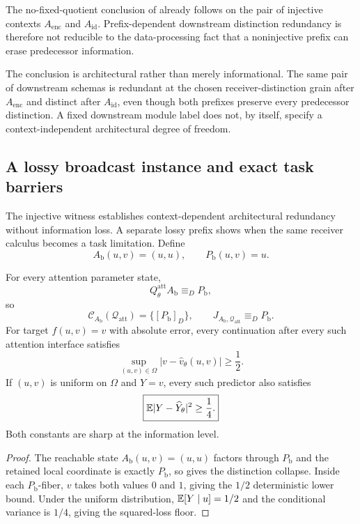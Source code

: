 \begin{corollary}\label{cor:injective-no-fixed-quotient-v14}
The no-fixed-quotient conclusion of  already follows on the pair of injective contexts $A_{\mathrm{enc}}$ and $A_{\mathrm{id}}$. Prefix-dependent downstream distinction redundancy is therefore not reducible to the data-processing fact that a noninjective prefix can erase predecessor information.
\end{corollary}

The conclusion is architectural rather than merely informational. The same pair of downstream schemas is redundant at the chosen receiver-distinction grain after $A_{\mathrm{enc}}$ and distinct after $A_{\mathrm{id}}$, even though both prefixes preserve every predecessor distinction. A fixed downstream module label does not, by itself, specify a context-independent architectural degree of freedom.

\subsection{A lossy broadcast instance and exact task barriers}

The injective witness establishes context-dependent architectural redundancy without information loss. A separate lossy prefix shows when the same receiver calculus becomes a task limitation. Define
\[
A_{\mathrm b}(u,v)=(u,u),
\qquad
P_{\mathrm b}(u,v)=u.
\]

\begin{proposition}\label{prop:broadcast-barrier-v14}
For every attention parameter state,
\[
Q^{\mathrm{att}}_\theta A_{\mathrm b}\equiv_DP_{\mathrm b},
\]
so
\[
\mathcal C_{A_{\mathrm b}}(\mathcal Q_{\mathrm{att}})=\{[P_{\mathrm b}]_D\},
\qquad
J_{A_{\mathrm b},\mathcal Q_{\mathrm{att}}}\equiv_DP_{\mathrm b}.
\]
For target $f(u,v)=v$ with absolute error, every continuation after every such attention interface satisfies
\[
\boxed{
\sup_{(u,v)\in\Omega}|v-\widehat v_\theta(u,v)|\ge\frac12.
}
\]
If $(u,v)$ is uniform on $\Omega$ and $Y=v$, every such predictor also satisfies
\[
\boxed{
\mathbb{E}|Y-\widehat Y_\theta|^2\ge\frac14.
}
\]
Both constants are sharp at the information level.
\end{proposition}

\begin{proof}
The reachable state $A_{\mathrm b}(u,v)=(u,u)$ factors through $P_{\mathrm b}$ and the retained local coordinate is exactly $P_{\mathrm b}$, so  gives the distinction collapse. Inside each $P_{\mathrm b}$-fiber, $v$ takes both values $0$ and $1$, giving the $1/2$ deterministic lower bound. Under the uniform distribution, $\mathbb{E}[Y\mid u]=1/2$ and the conditional variance is $1/4$, giving the squared-loss floor.
\end{proof}

